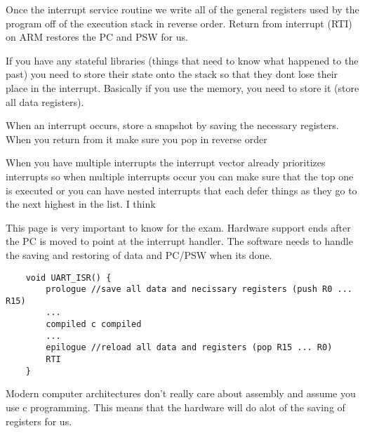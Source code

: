 \documentclass[12pt]{article}
\begin{document}
Once the interrupt service routine we write all of the general registers used by the program off of the execution stack in reverse order. Return from interrupt (RTI) on ARM restores the PC and PSW for us.

If you have any stateful libraries (things that need to know what happened to the past) you need to store their state onto the stack so that they dont lose their place in the interrupt. Basically if you use the memory, you need to store it (store all data registers).





When an interrupt occurs, store a snapshot by saving the necessary registers. When you return from it make sure you pop in reverse order



When you have multiple interrupts the interrupt vector already prioritizes interrupts so when multiple interrupts occur you can make sure that the top one is executed or you can have nested interrupts that each defer things as they go to the next highest in the list. I think



This page is very important to know for the exam. Hardware support ends after the PC is moved to point at the interrupt handler. The software needs to handle the saving and restoring of data and PC/PSW when its done.

\begin{lstlisting}
    void UART_ISR() {
        prologue //save all data and necissary registers (push R0 ... R15)
        ...
        compiled c compiled
        ...
        epilogue //reload all data and registers (pop R15 ... R0)
        RTI
    }
\end{lstlisting}

Modern computer architectures don't really care about assembly and assume you use c programming. This means that the hardware will do alot of the saving of registers for us.
\end{document}
